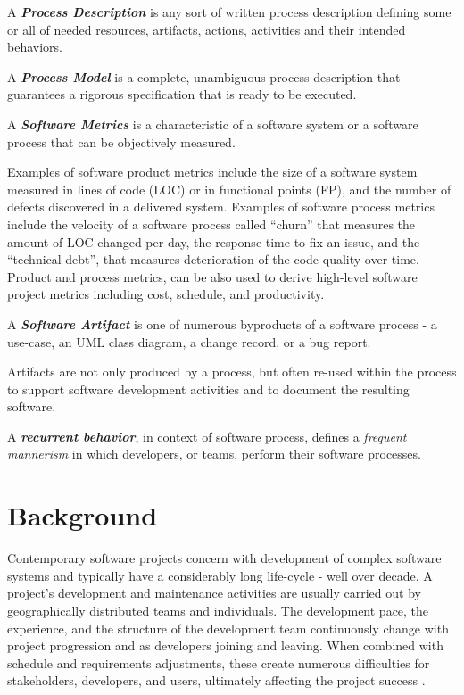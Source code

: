 \begin{defn}\label{def_process_desc}
A \textbf{\textit{Process Description}} is any sort of written process description defining 
some or all of needed resources, artifacts, actions, activities and their intended behaviors.
\end{defn}

\begin{defn}\label{def_process_model}
A \textbf{\textit{Process Model}} is a complete, unambiguous process description that guarantees 
a rigorous specification that is ready to be executed.
\end{defn}

\begin{defn}\label{def_metrics}
A \textbf{\textit{Software Metrics}} is a characteristic of a software system or a software process that can be 
objectively measured.
\end{defn}
Examples of software product metrics include the size of a software system measured in lines of code (LOC) or 
in functional points (FP), and the number of defects discovered in a delivered system. 
Examples of software process metrics include the velocity of a software process called ``churn'' that 
measures the amount of LOC changed per day, the response time to fix an issue, and the ``technical debt'', 
that measures deterioration of the code quality over time. 
Product and process metrics, can be also used to derive high-level software project metrics including cost, 
schedule, and productivity.

\begin{defn}\label{def_artifact}
A \textbf{\textit{Software Artifact}} is one of numerous byproducts of a software process - a use-case, 
an UML class diagram, a change record, or a bug report. 
\end{defn}
Artifacts are not only produced by a process, but often re-used within the process to support 
software development activities and to document the resulting software.

\begin{defn}\label{def_behavior}
A \textbf{\textit{recurrent behavior}}, in context of software process, defines a \textit{frequent mannerism} 
in which developers, or  teams, perform their software processes. 
\end{defn}

%
%
\section{Background}\label{sec_background}
Contemporary software projects concern with development of complex software systems and typically have 
a considerably long life-cycle - well over decade.
A project's development and maintenance activities are usually carried out by geographically 
distributed teams and individuals. The development pace, the experience, and the structure of the 
development team continuously change with project progression and as developers joining and leaving. 
When combined with schedule and requirements adjustments, these create numerous difficulties 
for stakeholders, developers, and users, ultimately affecting the project success \cite{citeulike:2207657}. 

